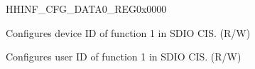 \begin{register}{H}{HINF\_CFG\_DATA0\_REG}{0x0000}\label{regdesc:HINFCFGDATA0REG}
%
%
\regnewline%
\begin{regdesc}\begin{reglist}
\label{fielddesc:HINFDEVICEIDFN1}\item [HINF\_DEVICE\_ID\_FN1] Configures device ID of function 1 in SDIO CIS. (R/W)
\label{fielddesc:HINFUSERIDFN1}\item [HINF\_USER\_ID\_FN1] Configures user ID of function 1 in SDIO CIS. (R/W)
\end{reglist}\end{regdesc}
\end{register}


